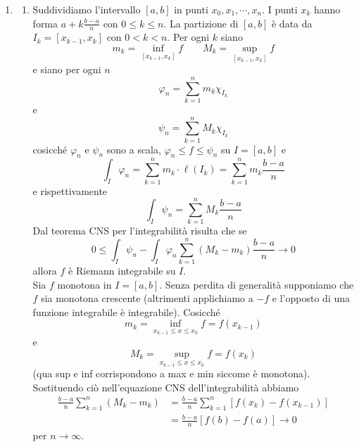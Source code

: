 \documentclass[a4paper]{article}
\begin{document}
\begin{snippetproof}{}
    \begin{enumerate}
        \item \begin{enumerate}
            \item Suddividiamo l'intervallo \([a,b]\) in punti \(x_0,x_1,\cdots, x_n\).
            I punti \(x_k\) hanno forma \(a + k \frac{b-a}{n}\) con \(0 \leq k \leq n\).
            La partizione di \([a,b]\) è data da \(I_k = [x_{k-1}, x_k]\) con \(0 < k < n\).
            Per ogni \(k\) siano
            \[
                m_k = \inf_{[x_{k-1},x_k]} f
                \qquad
                M_k = \sup_{[x_{k-1},x_k]} f
            \]
            e siano per ogni \(n\)
            \[
                \varphi_n = \sum_{k=1}^n m_k \chi_{I_k}
            \]
            e
            \[
                \psi_n = \sum_{k=1}^n M_k \chi_{I_k}
            \]
            cosicché \(\varphi_n\) e \(\psi_n\) sono a scala, \(\varphi_n \leq f \leq \psi_n\)
            su \(I = [a,b]\) e
            \[
                \int_I \varphi_n = \sum_{k=1}^n m_k \cdot \ell(I_k) = \sum_{k=1}^n m_k \frac{b-a}{n}
            \]
            e rispettivamente
            \[
                \int_I \psi_n = \sum_{k=1}^n M_k \frac{b-a}{n}
            \]
            Dal teorema CNS per l'integrabilità risulta che se
            \[
                0 \leq \int_I \psi_n - \int_I \varphi_n \sum_{k=1}^n (M_k - m_k)\frac{b-a}{n} \to 0
            \]
            allora \(f\) è Riemann integrabile su \(I\). \\
            Sia \(f\) monotona in \(I = [a,b]\).
            Senza perdita di generalità supponiamo che \(f\) sia monotona crescente (altrimenti applichiamo a \(-f\) e l'opposto di una funzione integrabile è integrabile).
            Cosicché
            \[
                m_k = \inf_{x_{k-1} \leq x \leq x_k} f = f(x_{k-1})
            \]
            e
            \[
                M_k = \sup_{x_{k-1} \leq x \leq x_k} f = f(x_k)
            \]
            (qua sup e inf corrispondono a max e min siccome è monotona).
            Sostituendo ciò nell'equazione CNS dell'integrabilità abbiamo
            \begin{align*}
                \frac{b-a}{n} \sum_{k=1}^n (M_k - m_k) &= \frac{b-a}{n} \sum_{k=1}^n \left[f(x_k) - f(x_{k-1})\right] \\
                &= \frac{b-a}{n} \left[f(b) - f(a)\right] \to 0
            \end{align*}
            per \(n \to \infty\).

\end{enumerate}
\end{enumerate}
\end{snippetproof}
\end{document}
